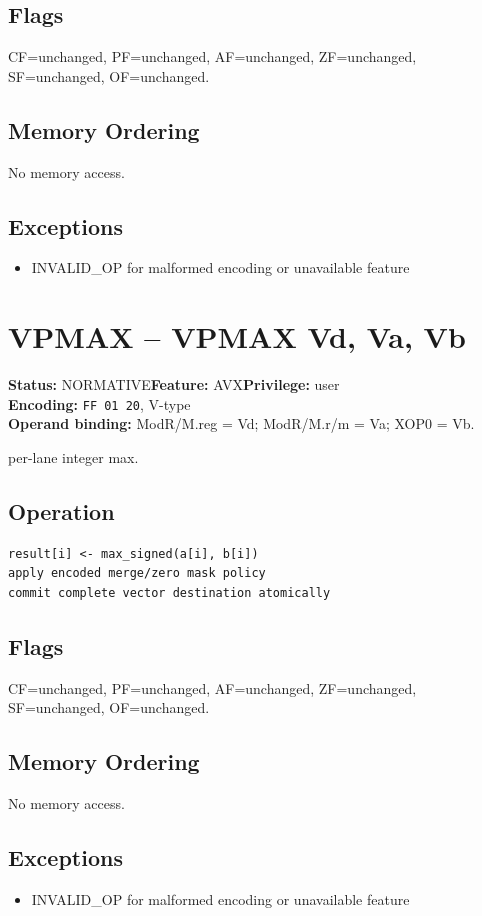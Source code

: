 \documentclass[10pt]{article}
\begin{document}
\subsection*{Flags}
CF=unchanged, PF=unchanged, AF=unchanged, ZF=unchanged, SF=unchanged, OF=unchanged.
\subsection*{Memory Ordering}
No memory access.
\subsection*{Exceptions}
\begin{itemize}
\item INVALID\_OP for malformed encoding or unavailable feature
\end{itemize}
\clearpage

\section{VPMAX -- VPMAX Vd, Va, Vb}
\textbf{Status:} NORMATIVE\quad \textbf{Feature:} AVX\quad \textbf{Privilege:} user\\
\textbf{Encoding:} \texttt{FF 01 20}, V-type\\
\textbf{Operand binding:} ModR/M.reg = Vd; ModR/M.r/m = Va; XOP0 = Vb.

per-lane integer max.

\subsection*{Operation}
\begin{lstlisting}
result[i] <- max_signed(a[i], b[i])
apply encoded merge/zero mask policy
commit complete vector destination atomically
\end{lstlisting}
\subsection*{Flags}
CF=unchanged, PF=unchanged, AF=unchanged, ZF=unchanged, SF=unchanged, OF=unchanged.
\subsection*{Memory Ordering}
No memory access.
\subsection*{Exceptions}
\begin{itemize}
\item INVALID\_OP for malformed encoding or unavailable feature
\end{itemize}
\clearpage
\end{document}
